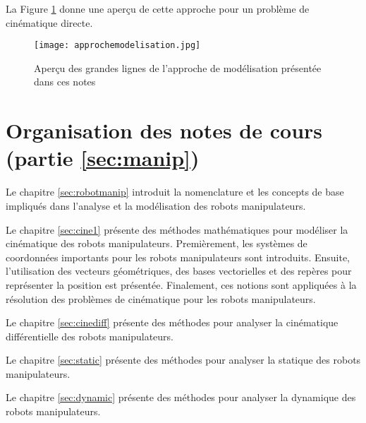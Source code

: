 La Figure \ref{fig:approchemodelisation} donne une aperçu de cette approche pour un problème de cinématique directe.

\begin{figure}[H]
	\centering
		\texttt{[image: approchemodelisation.jpg]}
	\caption{Aperçu des grandes lignes de l'approche de modélisation présentée dans ces notes}
	\label{fig:approchemodelisation}
\end{figure}

\section{Organisation des notes de cours (partie \ref{sec:manip})}

Le chapitre \ref{sec:robotmanip} introduit la nomenclature et les concepts de base impliqués dans l'analyse et la modélisation des robots manipulateurs. 

Le chapitre \ref{sec:cine1} présente des méthodes mathématiques pour modéliser la cinématique des robots manipulateurs. Premièrement, les systèmes de coordonnées importants pour les robots manipulateurs sont introduits. Ensuite, l'utilisation des vecteurs géométriques, des bases vectorielles et des repères pour représenter la position est présentée. Finalement, ces notions sont appliquées à la résolution des problèmes de cinématique pour les robots manipulateurs. 

Le chapitre \ref{sec:cinediff} présente des méthodes pour analyser la cinématique différentielle des robots manipulateurs. 

Le chapitre \ref{sec:static} présente des méthodes pour analyser la statique des robots manipulateurs. 

Le chapitre \ref{sec:dynamic} présente des méthodes pour analyser la dynamique des robots manipulateurs. 